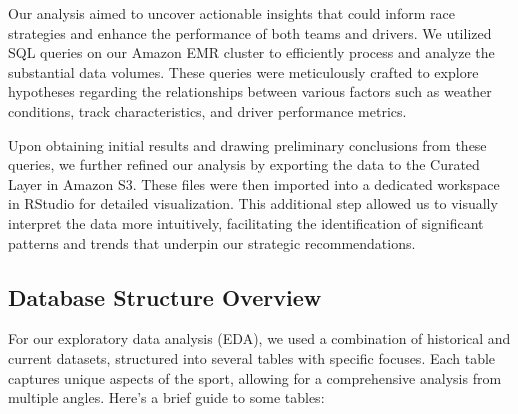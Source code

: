 \documentclass{article}
\begin{document}
Our analysis aimed to uncover actionable insights that could inform race strategies and enhance the performance of both teams and drivers. We utilized SQL queries on our Amazon EMR cluster to efficiently process and analyze the substantial data volumes. These queries were meticulously crafted to explore hypotheses regarding the relationships between various factors such as weather conditions, track characteristics, and driver performance metrics.

Upon obtaining initial results and drawing preliminary conclusions from these queries, we further refined our analysis by exporting the data to the Curated Layer in Amazon S3. These files were then imported into a dedicated workspace in RStudio for detailed visualization. This additional step allowed us to visually interpret the data more intuitively, facilitating the identification of significant patterns and trends that underpin our strategic recommendations.

\subsection{Database Structure Overview}
For our exploratory data analysis (EDA), we used a combination of historical and current datasets, structured into several tables with specific focuses. Each table captures unique aspects of the sport, allowing for a comprehensive analysis from multiple angles. Here's a brief guide to some tables:
\end{document}
